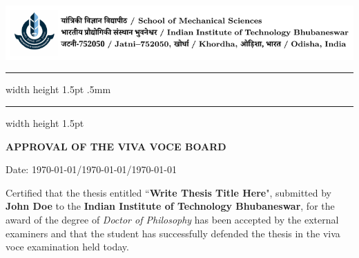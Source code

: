 
\chapter*{}
\vspace{-1cm} %

{\centering \includegraphics[width=\linewidth, scale=1]{iitbbs_letterhead}}
{\hrule width \hsize height 1.5pt \kern .5mm \hrule width \hsize height 1.5pt}

\vspace{2ex}
\begin{center}
    \textbf{\Large APPROVAL OF THE VIVA VOCE BOARD}
\end{center}

\begin{flushright}
    Date: \thisdate\today/\thismonthdigit\today/\thisyear\today
\end{flushright}

\par Certified that the thesis entitled ``\textbf{Write Thesis Title Here}", submitted by \textbf{John Doe} to the \textbf{Indian Institute of Technology Bhubaneswar}, for the award of the degree of \textit{Doctor of Philosophy} has been accepted by the external examiners and that the student has successfully defended the thesis in the viva voce examination held today.

